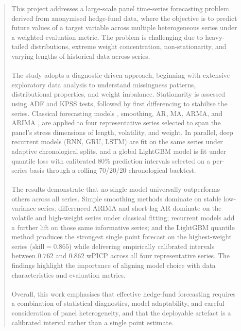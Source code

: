 \documentclass[11pt]{article}
\begin{document}
\begin{abstract}
This project addresses a large-scale panel time-series forecasting problem derived from anonymised hedge-fund data, where the objective is to predict future values of a target variable across multiple heterogeneous series under a weighted evaluation metric. The problem is challenging due to heavy-tailed distributions, extreme weight concentration, non-stationarity, and varying lengths of historical data across series.
\\
\\
The study adopts a diagnostic-driven approach, beginning with extensive exploratory data analysis to understand missingness patterns, distributional properties, and weight imbalance. Stationarity is assessed using ADF and KPSS tests, followed by first differencing to stabilise the series. Classical forecasting models , smoothing, AR, MA, ARMA, and ARIMA , are applied to four representative series selected to span the panel's stress dimensions of length, volatility, and weight. In parallel, deep recurrent models (RNN, GRU, LSTM) are fit on the same series under adaptive chronological splits, and a global LightGBM model is fit under quantile loss with calibrated $80\%$ prediction intervals selected on a per-series basis through a rolling 70/20/20 chronological backtest.
\\
\\
The results demonstrate that no single model universally outperforms others across all series. Simple smoothing methods dominate on stable low-variance series; differenced ARIMA and short-lag AR dominate on the volatile and high-weight series under classical fitting; recurrent models add a further lift on those same informative series; and the LightGBM quantile method produces the strongest single point forecast on the highest-weight series ($\text{skill} = 0.865$) while delivering empirically calibrated intervals between $0.762$ and $0.862$ wPICP across all four representative series. The findings highlight the importance of aligning model choice with data characteristics and evaluation metrics.
\\
\\
Overall, this work emphasises that effective hedge-fund forecasting requires a combination of statistical diagnostics, model adaptability, and careful consideration of panel heterogeneity, and that the deployable artefact is a calibrated interval rather than a single point estimate.
\end{abstract}

\clearpage
\tableofcontents













\end{document}

